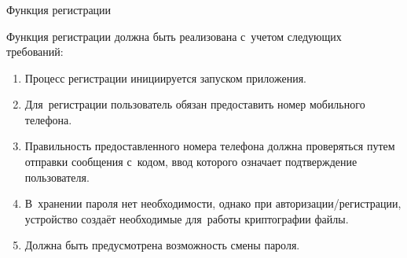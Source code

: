 \subsubsection{} Функция регистрации
\label{sec:analysis:research:funcreq:registration}

Функция регистрации должна быть реализована с~учетом следующих требований:

\begin{enumerate}
	\item Процесс регистрации инициируется запуском приложения.
	\item Для~регистрации пользователь обязан предоставить номер мобильного телефона.
	\item Правильность предоставленного номера телефона должна проверяться путем отправки сообщения с~кодом, ввод которого означает подтверждение пользователя.
	\item В~хранении пароля нет необходимости, однако при авторизации/регистрации, устройство создаёт необходимые для~работы криптографии файлы.
	\item Должна быть предусмотрена возможность смены пароля.
\end{enumerate}